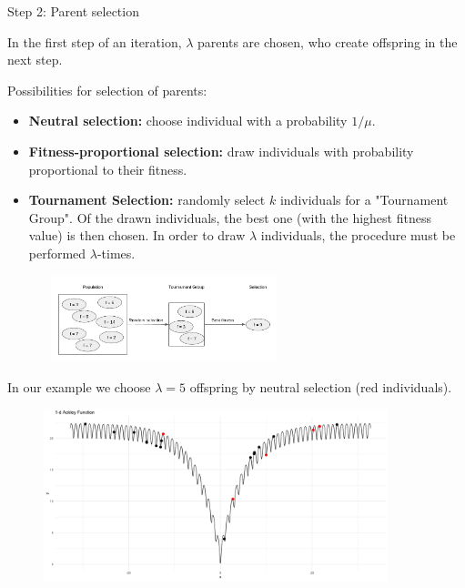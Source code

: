 \begin{frame}{Step 2: Parent selection}


In the first step of an iteration, $\lambda$ parents are chosen, who create offspring in the next step. %

Possibilities for selection of parents:
\begin{itemize}
\item \textbf{Neutral selection: }choose individual with a probability $1/\mu$.
\item \textbf{Fitness-proportional selection: }draw individuals with probability proportional to their fitness.
\item \textbf{Tournament Selection: }randomly select $k$ individuals for a "Tournament Group". Of the drawn individuals, the best one (with the highest fitness value) is then chosen. In order to draw $\lambda$ individuals, the procedure must be performed $\lambda$-times.
\end{itemize}
\vspace*{-0.2cm}
\begin{figure}
\includegraphics[width = 7cm, height = 2.5cm ]{images/tournament_selection.png}
\end{figure}

\framebreak

In our example we choose $\lambda = 5$ offspring by neutral selection (red individuals).

\begin{center}
\begin{figure}
\includegraphics[width=\textwidth, height=5cm]{images/ea_ex3.png}
\end{figure}
\end{center}

\end{frame}

